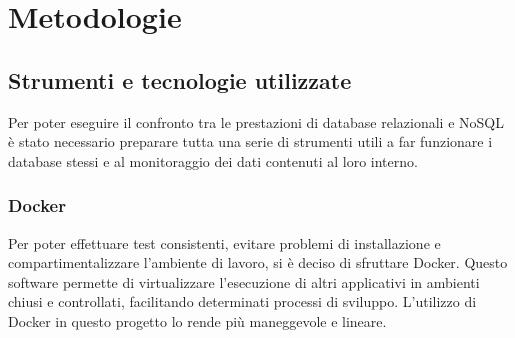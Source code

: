 
\chapter{Metodologie}
\label{cap:metodologie}


\section{Strumenti e tecnologie utilizzate}
Per poter eseguire il confronto tra le prestazioni di database relazionali e NoSQL è stato necessario preparare tutta una serie di strumenti utili a far funzionare i database stessi e al monitoraggio dei dati contenuti al loro interno.

\subsection{Docker}
Per poter effettuare test consistenti, evitare problemi di installazione e compartimentalizzare l'ambiente di lavoro, si è deciso di sfruttare Docker. Questo software permette di virtualizzare l'esecuzione di altri applicativi in ambienti chiusi e controllati, facilitando determinati processi di sviluppo. L'utilizzo di Docker in questo progetto lo rende più maneggevole e lineare.\\

